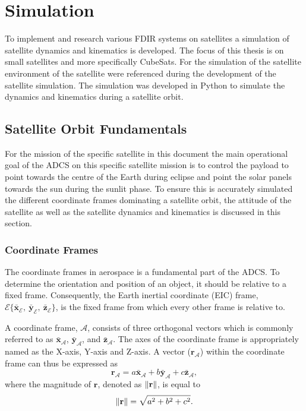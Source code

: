 \chapter{Simulation}
\label{chap:Simulation}

To implement and research various FDIR systems on satellites a simulation of satellite dynamics and kinematics is developed. The focus of this thesis is on small satellites and more specifically CubeSats. For the simulation of the satellite environment of the satellite \cite{auret2012design, JansevanVuuren2015, Jordaan2016} were referenced during the development of the satellite simulation. The simulation was developed in Python to simulate the dynamics and kinematics during a satellite orbit.

\section{Satellite Orbit Fundamentals}

For the mission of the specific satellite in this document the main operational goal of the ADCS on this specific satellite mission is to control the payload to point towards the centre of the Earth during eclipse and point the solar panels towards the sun during the sunlit phase. To ensure this is accurately simulated the different coordinate frames dominating a satellite orbit, the attitude of the satellite as well as the satellite dynamics and kinematics is discussed in this section.

\subsection{Coordinate Frames}
The coordinate frames in aerospace is a fundamental part of the ADCS. To determine the orientation and position of an object, it should be relative to a fixed frame. Consequently, the Earth inertial coordinate (EIC) frame, $\mathcal{E}\{\bar{\mathbf{x}}_{\mathcal{E}},~\bar{\mathbf{y}}_{\mathcal{E}},~\bar{\mathbf{z}}_{\mathcal{E}}\}$, is the fixed frame from which every other frame is relative to.

A coordinate frame, $\mathcal{A}$, consists of three orthogonal vectors which is commonly referred to as $\bar{\mathbf{x}}_\mathcal{A}$, $\bar{\mathbf{y}}_\mathcal{A}$, and $\bar{\mathbf{z}}_\mathcal{A}$. The axes of the coordinate frame is appropriately named as the X-axis, Y-axis and Z-axis. A vector ($\mathbf{r}_\mathcal{A}$) within the coordinate frame can thus be expressed as 
\begin{equation}
\mathbf{r}_\mathcal{A} = a\bar{\mathbf{x}}_\mathcal{A} + b\bar{\mathbf{y}}_\mathcal{A} + c\bar{\mathbf{z}}_\mathcal{A},
\end{equation}
where the magnitude of $\mathbf{r}$, denoted as $\left\lVert\mathbf{r}\right\rVert$, is equal to 
\begin{equation}
\left\lVert\mathbf{r}\right\rVert = \sqrt{a^2 + b^2 + c^2}.
\end{equation}

